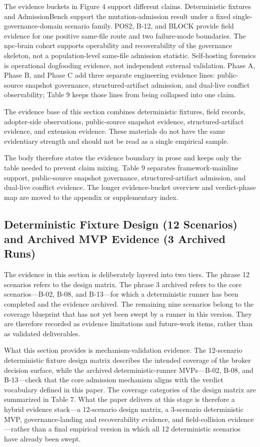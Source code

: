 \documentclass[9pt,letterpaper]{extarticle}
\begin{document}
The evidence buckets in Figure 4 support different claims. Deterministic fixtures and AdmissionBench support the mutation-admission result under a fixed single-governance-domain scenario family. POS2, B-12, and BLOCK provide field evidence for one positive same-file route and two failure-mode boundaries. The npc-brain cohort supports operability and recoverability of the governance skeleton, not a population-level same-file admission statistic. Self-hosting forensics is operational dogfooding evidence, not independent external validation. Phase A, Phase B, and Phase C add three separate engineering evidence lines: public-source snapshot governance, structured-artifact admission, and dual-live conflict observability; Table 9 keeps those lines from being collapsed into one claim.

The evidence base of this section combines deterministic fixtures, field records, adopter-side observations, public-source snapshot evidence, structured-artifact evidence, and extension evidence. These materials do not have the same evidentiary strength and should not be read as a single empirical sample.

The body therefore states the evidence boundary in prose and keeps only the table needed to prevent claim mixing. Table 9 separates framework-mainline support, public-source snapshot governance, structured-artifact admission, and dual-live conflict evidence. The longer evidence-bucket overview and verdict-phase map are moved to the appendix or supplementary index.

\subsection{Deterministic Fixture Design (12 Scenarios) and Archived MVP Evidence (3 Archived Runs)}

The evidence in this section is deliberately layered into two tiers. The phrase {}12 scenarios{} refers to the design matrix. The phrase {}3 archived{} refers to the core scenarios---B-02, B-08, and B-13---for which a deterministic runner has been completed and the evidence archived. The remaining nine scenarios belong to the coverage blueprint that has not yet been swept by a runner in this version. They are therefore recorded as evidence limitations and future-work items, rather than as validated deliverables.

What this section provides is mechanism-validation evidence. The 12-scenario deterministic fixture design matrix describes the intended coverage of the broker decision surface, while the archived deterministic-runner MVPs---B-02, B-08, and B-13---check that the core admission mechanism aligns with the verdict vocabulary defined in this paper. The coverage categories of the design matrix are summarized in Table 7. What the paper delivers at this stage is therefore a hybrid evidence stack---a 12-scenario design matrix, a 3-scenario deterministic MVP, governance-landing and recoverability evidence, and field-collision evidence---rather than a final empirical version in which all 12 deterministic scenarios have already been swept.
\end{document}
